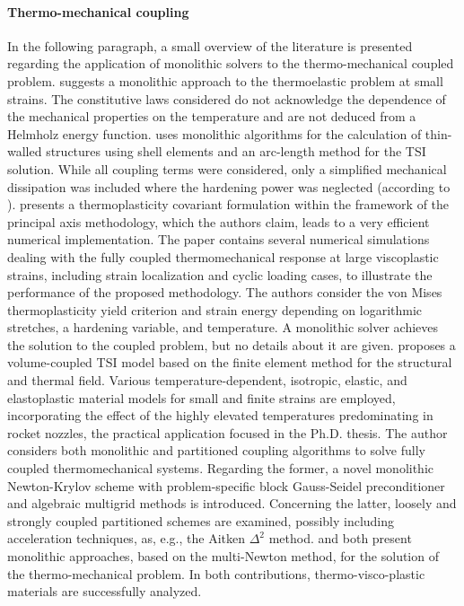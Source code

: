 \paragraph{Thermo-mechanical coupling}

In the following paragraph, a small overview of the literature is presented regarding the application of monolithic solvers to the thermo-mechanical coupled problem.
\cite{carter_finite_1989} suggests a monolithic approach to the thermoelastic problem at small strains.
The constitutive laws considered do not acknowledge the dependence of the mechanical properties on the temperature and are not deduced from a Helmholz energy function.
\cite{glaser_gekoppelte_1992} uses monolithic algorithms for the calculation of thin-walled structures using shell elements and an arc-length method for the TSI solution.
While all coupling terms were considered, only a simplified mechanical dissipation was included where the hardening power was neglected (according to \cite{danowski_computational_2014}).
\cite{ibrahimbegovic_covariant_2002} presents a thermoplasticity covariant formulation within the framework of the principal axis methodology, which the authors claim, leads to a very efficient numerical implementation.
The paper contains several numerical simulations dealing with the fully coupled thermomechanical response at large viscoplastic strains, including strain localization and cyclic loading cases, to illustrate the performance of the proposed methodology.
The authors consider the von Mises thermoplasticity yield criterion and strain energy depending on logarithmic stretches, a hardening variable, and temperature.
A monolithic solver achieves the solution to the coupled problem, but no details about it are given.
\cite{danowski_computational_2014} proposes a volume-coupled TSI model based on the finite element method for the structural and thermal field.
Various temperature-dependent, isotropic, elastic, and elastoplastic material models for small and finite strains are employed, incorporating the effect of the highly elevated temperatures predominating in rocket nozzles, the practical application focused in the Ph.D. thesis.
The author considers both monolithic and partitioned coupling algorithms to solve fully coupled thermomechanical systems.
Regarding the former,  a novel monolithic Newton-Krylov scheme with problem-specific block Gauss-Seidel preconditioner and algebraic multigrid methods is introduced.
Concerning the latter, loosely and strongly coupled partitioned schemes are examined, possibly including acceleration techniques, as, e.g., the Aitken \(\Delta^2\) method.
\cite{netz_high-order_2013} and \cite{rothe_monolithic_2015} both present monolithic approaches, based on the multi-Newton method, for the solution of the thermo-mechanical problem.
In both contributions, thermo-visco-plastic materials are successfully analyzed.

